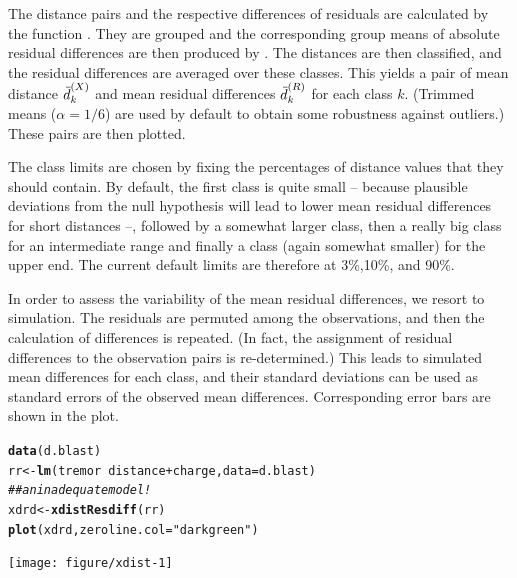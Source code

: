 \documentclass[11pt]{article}\usepackage[]{graphicx}\usepackage[]{color}
\makeatletter
\newcommand{\hlstr}[1]{\textcolor[rgb]{0.192,0.494,0.8}{#1}}%
\newcommand{\hlcom}[1]{\textcolor[rgb]{0.678,0.584,0.686}{\textit{#1}}}%
\newcommand{\hlopt}[1]{\textcolor[rgb]{0,0,0}{#1}}%
\newcommand{\hlstd}[1]{\textcolor[rgb]{0.345,0.345,0.345}{#1}}%
\newcommand{\hlkwb}[1]{\textcolor[rgb]{0.69,0.353,0.396}{#1}}%
\newcommand{\hlkwc}[1]{\textcolor[rgb]{0.333,0.667,0.333}{#1}}%
\newcommand{\hlkwd}[1]{\textcolor[rgb]{0.737,0.353,0.396}{\textbf{#1}}}%
\newenvironment{kframe}{%
 \def\at@end@of@kframe{}%
 \ifinner\ifhmode%
  \def\at@end@of@kframe{\end{minipage}}%
  \begin{minipage}{\columnwidth}%
 \fi\fi%
 \def\FrameCommand##1{\hskip\@totalleftmargin \hskip-\fboxsep
 \colorbox{shadecolor}{##1}\hskip-\fboxsep
     \hskip-\linewidth \hskip-\@totalleftmargin \hskip\columnwidth}%
 \MakeFramed {\advance\hsize-\width
   \@totalleftmargin\z@ \linewidth\hsize
   \@setminipage}}%
 {\par\unskip\endMakeFramed%
 \at@end@of@kframe}
\newenvironment{knitrout}{}{} %
\makeatother
\begin{document}
The distance pairs and the respective differences of residuals are
calculated by the function \Hneed{40mm}
. They are grouped and the
corresponding group means of absolute residual differences are then
produced by . 
The distances are then classified, and the residual differences
are averaged over these classes. This yields a pair of mean distance 
$\wb d\sups X_k$ and mean residual differences $\wb d\sups R_k$ 
for each class $k$. 
(Trimmed means ($\alpha=1/6$) are used by default to obtain some
robustness against outliers.)
These pairs are then plotted.

The class limits are chosen by fixing the percentages of distance values
that they should contain. By default, the first class is quite small -- 
because plausible deviations from the null hypothesis will lead to lower
mean residual differences for short distances --, followed by a somewhat
larger class, then a really big class for an intermediate range and finally
a class (again somewhat smaller) for the upper end. 
The current default limits are therefore at 3\%,10\%, and 90\%. 

In order to assess the variability of the mean residual differences,
we resort to simulation. The residuals are permuted among the observations,
and then the calculation of differences is repeated.
(In fact, the assignment of residual differences to the observation pairs 
is re-determined.) This leads to simulated mean differences for each class,
and their standard deviations can be used as standard errors of the 
observed mean differences. Corresponding error bars are shown in the
plot. 

\begin{knitrout}
\color{fgcolor}\begin{kframe}
\begin{alltt}
\hlkwd{data}\hlstd{(d.blast)}
\hlstd{rr} \hlkwb{<-} \hlkwd{lm}\hlstd{(tremor}\hlopt{~}\hlstd{distance}\hlopt{+}\hlstd{charge,} \hlkwc{data}\hlstd{=d.blast)}
\hlcom{## an inadequate model!}
\hlstd{xdrd} \hlkwb{<-} \hlkwd{xdistResdiff}\hlstd{(rr)}
\hlkwd{plot}\hlstd{(xdrd,} \hlkwc{zeroline.col}\hlstd{=}\hlstr{"darkgreen"}\hlstd{)}
\end{alltt}


{\ttfamily\noindent\color{warningcolor}{\#\# Warning in FUN(newX[, i], ...): :robrange: not enough valid data. returning ordinary range}}

{\ttfamily\noindent\color{warningcolor}{\#\# Warning in FUN(newX[, i], ...): :robrange: not enough valid data. returning ordinary range}}

{\ttfamily\noindent\color{warningcolor}{\#\# Warning in FUN(newX[, i], ...): :robrange: not enough valid data. returning ordinary range}}\end{kframe}
\texttt{[image: figure/xdist-1]} 

\end{knitrout}
\end{document}
